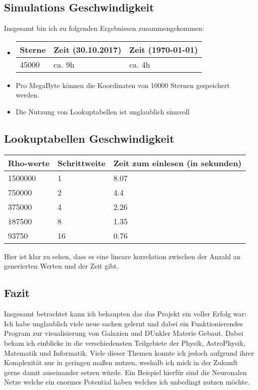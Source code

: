 \subsection{Simulations Geschwindigkeit}

Insgesamt bin ich zu folgenden Ergebnissen zusammengekommen:

\begin{itemize}
  \item
  \begin{tabular}{l | l | l}

    Sterne  & Zeit (30.10.2017)  & Zeit (\today) \\ \hline\hline
    45000     & ca. 9h            & ca. 4h \\
  \end{tabular}

  \item Pro MegaByte können die Koordinaten von 10000 Sternen gespeichert werden.

  \item Die Nutzung von Lookuptabellen ist unglaublich sinnvoll
\end{itemize}

\subsection{Lookuptabellen Geschwindigkeit}

\begin{tabular}{l | l | l}
Rho-werte  & Schrittweite & Zeit zum einlesen (in sekunden) \\ \hline\hline
1500000     & 1     & 8.07  \\
750000      & 2     & 4.4   \\
375000      & 4     & 2.26  \\
187500      & 8     & 1.35  \\
93750       & 16    & 0.76  \\
\end{tabular}

Hier ist klar zu sehen, dass es eine lineare korrelation zwischen der Anzahl
an generierten Werten und der Zeit gibt.

\subsection{Fazit}

Insgesamt betrachtet kann ich behaupten das das Projekt ein voller Erfolg war:
Ich habe unglaublich viele neue sachen gelernt und dabei ein Funktionierendes
Program zur visualisierung von Galaxien und DUnkler Materie Gebaut. Dabei bekam
ich einblicke in die verschiedensten Teilgebiete der Physik, AstroPhysik, Matematik
und Informatik. Viele dieser Themen konnte ich jedoch aufgrund ihrer Komplexität
nur in geringen maßen nutzen, weshalb ich mich in der Zukunft gerne damit
auseinander setzen würde. Ein Beispiel hierfür sind die Neuronalen Netze welche
ein enormes Potential haben welches ich unbedingt nutzen möchte.
